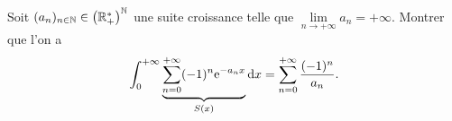 \documentclass[12pt]{article}
\begin{document}
\begin{exercise}
    Soit $(a_n)_{n\in\mathbb{N}}\in\left(\mathbb{R}_{+}^{*}\right)^{\mathbb{N}}$ une suite croissance telle que $\lim\limits_{n\to+\infty}a_n=+\infty$. Montrer que l'on a 
    \begin{equation}
        \int_{0}^{+\infty}\underbrace{\sum_{n=0}^{+\infty}(-1)^{n}\mathrm{e}^{-a_n x}}_{S(x)}\mathrm{d} x=\sum_{n=0}^{+\infty}\frac{(-1)^{n}}{a_n}.
    \end{equation}
\end{exercise}
\end{document}
